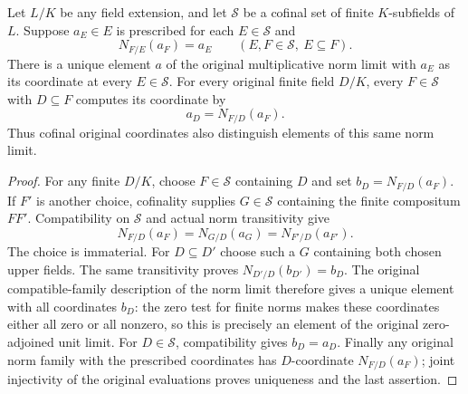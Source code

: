 \begin{lemma}
\label{fw:cofinal-norm-family-extension}
\leanok
Let $L/K$ be any field extension, and let $\mathcal S$ be a cofinal
set of finite $K$-subfields of $L$. Suppose $a_E\in E$ is prescribed
for each $E\in\mathcal S$ and
\[
 N_{F/E}(a_F)=a_E
 \qquad(E,F\in\mathcal S,\ E\subseteq F).
\]
There is a unique element $a$ of the original multiplicative norm
limit with $a_E$ as its coordinate at every $E\in\mathcal S$.
For every original finite field $D/K$, every $F\in\mathcal S$ with
$D\subseteq F$ computes its coordinate by
\[
 a_D=N_{F/D}(a_F).
\]
Thus cofinal original coordinates also distinguish elements of this
same norm limit.
\end{lemma}
\begin{proof}
For any finite $D/K$, choose $F\in\mathcal S$ containing $D$ and set
$b_D=N_{F/D}(a_F)$. If $F'$ is another choice, cofinality supplies
$G\in\mathcal S$ containing the finite compositum $FF'$.
Compatibility on $\mathcal S$ and actual norm transitivity give
\[
 N_{F/D}(a_F)=N_{G/D}(a_G)=N_{F'/D}(a_{F'}).
\]
The choice is immaterial. For $D\subseteq D'$ choose such a $G$
containing both chosen upper fields. The same transitivity proves
$N_{D'/D}(b_{D'})=b_D$. The original compatible-family
description of the norm limit therefore gives a unique element
with all coordinates $b_D$: the zero test for finite norms makes
these coordinates either all zero or all nonzero, so this is
precisely an element of the original zero-adjoined unit limit.
For $D\in\mathcal S$, compatibility gives $b_D=a_D$.
Finally any original norm family with the prescribed coordinates
has $D$-coordinate $N_{F/D}(a_F)$; joint injectivity of the original
evaluations proves uniqueness and the last assertion.
\end{proof}

